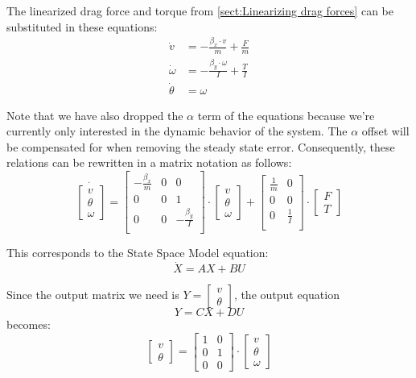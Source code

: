The linearized drag force and torque from \ref{sect:Linearizing drag forces} can be substituted in these equations:
\begin{align}
 \dot{v} &= - \frac{\beta_{x} \cdot v}{m} + \frac{F}{m}\\
 \dot{\omega} &= - \frac{\beta_{y} \cdot \omega}{I} + \frac{T}{I}\\
 \dot{\theta} &= \omega
\end{align}

Note that we have also dropped the $ \alpha $ term of the equations because we're currently only interested in the dynamic behavior of the system. The $ \alpha $ offset will be compensated for when removing the steady state error. Consequently, these relations can be rewritten in a matrix notation as follows:
\[
\dot{
	\begin{bmatrix}
	 v\\
	 \theta\\
	 \omega
	\end{bmatrix}
}
=
\begin{bmatrix}
 -\frac{\beta_{x}}{m} & 0 & 0\\
 0 & 0 & 1\\
 0 & 0 & - \frac{\beta_{y}}{I}\\
\end{bmatrix}
\cdot
\begin{bmatrix}
v\\
\theta\\
\omega
\end{bmatrix}
+
\begin{bmatrix}
\frac{1}{m} & 0\\
0 & 0\\
0 & \frac{1}{I}\\
\end{bmatrix}
\cdot
\begin{bmatrix}
F\\
T
\end{bmatrix}
\]

This corresponds to the State Space Model equation:
\[\dot{X} = AX + BU\]

Since the output matrix we need is $ Y = \begin{bmatrix}v \\ \theta \end{bmatrix} $, the output equation
\[Y = CX + DU\]
becomes:
\[\begin{bmatrix}v \\ \theta \end{bmatrix}
 = 
\begin{bmatrix}
1 & 0\\
0 & 1\\
0 & 0
\end{bmatrix}
\cdot
\begin{bmatrix}
v\\
\theta\\
\omega
\end{bmatrix}
\]


